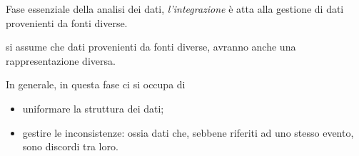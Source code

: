 \documentclass{subfiles}
\begin{document}
Fase essenziale della analisi dei dati, \emph{l'integrazione} è atta alla gestione di dati provenienti da fonti diverse.
\begin{MarginNote}
    si assume che dati provenienti da fonti diverse, avranno anche una rappresentazione diversa.
\end{MarginNote}
In generale, in questa fase ci si occupa di
\begin{itemize}
    \item uniformare la struttura dei dati;
    \item gestire le inconsistenze: ossia dati che, sebbene riferiti ad uno stesso evento, sono discordi tra loro.
\end{itemize}
\end{document}
